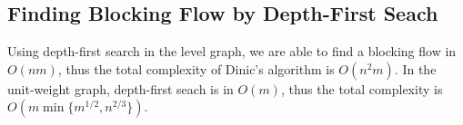 \subsection{Finding Blocking Flow by Depth-First Seach}

Using depth-first search in the level graph, we are able to find a blocking flow in $O(nm)$, thus the total complexity of Dinic's algorithm is $O(n^2 m)$. In the unit-weight graph, depth-first seach is in $O(m)$, thus the total complexity is $O(m \min\{m^{1/2}, n^{2/3}\})$.
